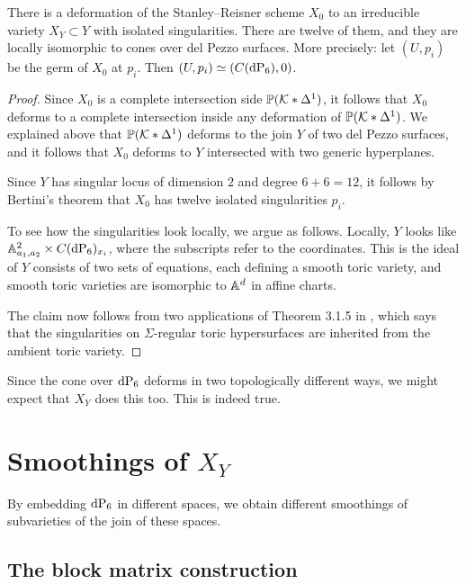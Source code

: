 \begin{proposition}
There is a deformation of the Stanley--Reisner scheme $X_0$ to an irreducible \CY variety $X_Y \subset Y$ with isolated singularities. There are twelve of them, and they are locally isomorphic to cones over del Pezzo surfaces. More precisely: let $(U,p_i)$ be the germ of $X_0$ at $p_i$. Then $(U,p_i) \simeq (C(\dP6),0)$.
\end{proposition}
\begin{proof}
Since $X_0$ is a complete intersection side $\mathbb{P}(\mathcal{K} \ast \Delta^1)$, it follows that $X_0$ deforms to a complete intersection inside any deformation of $\mathbb{P}(\mathcal{K} \ast \Delta^1)$. We explained above that $\mathbb{P}(\mathcal{K} \ast \Delta^1)$ deforms to the join $Y$ of two del Pezzo surfaces, and it follows that $X_0$ deforms to $Y$ intersected with two generic hyperplanes.

Since $Y$ has singular locus of dimension $2$ and degree $6+6=12$, it follows by Bertini's theorem \cite[Chapter II, Theorem 8.18]{hartshorne} that $X_0$ has twelve isolated singularities $p_i$.

To see how the singularities look locally, we argue as follows. Locally, $Y$ looks like $\A^2_{a_1,a_2} \times C(\dP6)_{x_i}$, where the subscripts refer to the coordinates. This is the ideal of $Y$ consists of two sets of equations, each defining a smooth toric variety, and smooth toric varieties are isomorphic to $\mathbb{A}^d$ in affine  charts.

The claim now follows from two applications of Theorem 3.1.5 in \cite{batyrev_mirrorsymmetry}, which says that the singularities on $\Sigma$-regular toric hypersurfaces are inherited from the ambient toric variety.
\end{proof}

Since the cone over $\dP6$ deforms in two topologically different ways, we might expect that $X_Y$ does this too. This is indeed true.

\section[Smoothings of XY]{Smoothings of $X_Y$}

By embedding $\dP6$ in different spaces, we obtain different smoothings of subvarieties of the join of these spaces.

\subsection{The block matrix construction}

